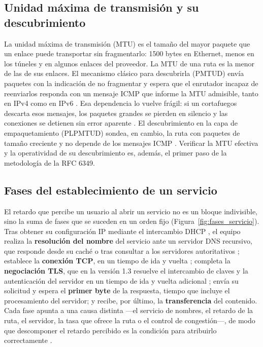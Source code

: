 \subsection{Unidad máxima de transmisión y su descubrimiento}

La unidad máxima de transmisión (MTU) es el tamaño del mayor paquete que un enlace puede transportar sin fragmentarlo: 1500 bytes en Ethernet, menos en los túneles y en algunos enlaces del proveedor. La MTU de una ruta es la menor de las de sus enlaces. El mecanismo clásico para descubrirla (PMTUD) envía paquetes con la indicación de no fragmentar y espera que el enrutador incapaz de reenviarlos responda con un mensaje ICMP que informe la MTU admisible, tanto en IPv4 \cite{rfc1191} como en IPv6 \cite{rfc8201}. Esa dependencia lo vuelve frágil: si un cortafuegos descarta esos mensajes, los paquetes grandes se pierden en silencio y las conexiones se detienen sin error aparente \cite{luckie2010pmtud}. El descubrimiento en la capa de empaquetamiento (PLPMTUD) sondea, en cambio, la ruta con paquetes de tamaño creciente y no depende de los mensajes ICMP \cite{rfc4821}. Verificar la MTU efectiva y la operatividad de su descubrimiento es, además, el primer paso de la metodología de la RFC 6349.

\subsection{Fases del establecimiento de un servicio}

El retardo que percibe un usuario al abrir un servicio no es un bloque indivisible, sino la suma de fases que se suceden en un orden fijo (Figura~\ref{fig:fases_servicio}). Tras obtener su configuración IP mediante el intercambio DHCP \cite{rfc2131}, el equipo realiza la \textbf{resolución del nombre} del servicio ante un servidor DNS recursivo, que responde desde su caché o tras consultar a los servidores autoritativos \cite{rfc1034}; establece la \textbf{conexión TCP}, en un tiempo de ida y vuelta \cite{rfc9293}; completa la \textbf{negociación TLS}, que en la versión 1.3 resuelve el intercambio de claves y la autenticación del servidor en un tiempo de ida y vuelta adicional \cite{rfc8446}; envía su solicitud y espera el \textbf{primer byte} de la respuesta, tiempo que incluye el procesamiento del servidor; y recibe, por último, la \textbf{transferencia} del contenido. Cada fase apunta a una causa distinta ---el servicio de nombres, el retardo de la ruta, el servidor, la tasa que ofrece la ruta o el control de congestión---, de modo que descomponer el retardo percibido es la condición para atribuirlo correctamente \cite{sundaresan2013web}.

